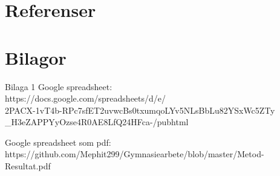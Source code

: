 \documentclass[11p]{article}
\begin{document}
\begin{otherlanguage}{swedish}
    \newpage
    \section{Referenser}

    \printbibliography[heading=none]

    \newpage
    \section{Bilagor}
    Bilaga 1
    Google spreadsheet:
    \\ https://docs.google.com/spreadsheets/d/e/
    \\2PACX-1vT4b-RPc7sfET2uvwcBs0txumqoLYv5NLsBbLu82YSxWc5ZTy
    \\\_H3eZAPPYyOzse4R0AE8LfQ24HFca-/pubhtml

    Google spreadsheet som pdf:
    \\https://github.com/Mephit299/Gymnasiearbete/blob/master/Metod-Resultat.pdf

    \end{otherlanguage}
\end{document}
